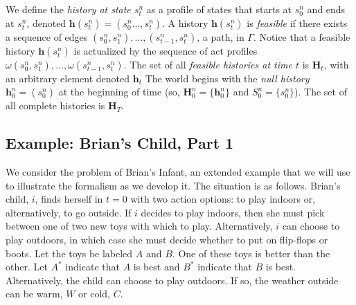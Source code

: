 \documentclass[
11pt,
titlepage,
reqno,
]{article}%
\theoremstyle{definition}
\begin{document}
We define the \textit{history at state $s^n_t$} as a profile of states that starts at $s^n_0$ and ends at $s^n_t$, denoted $\mathbf{h}(s^n_t)=(s^n_0\ldots,s^n_t)$.
A history $\mathbf{h}(s^n_t)$ is \textit{feasible} if there exists a sequence of edges $(s^n_0,s^n_1),\ldots,(s^n_{t-1},s^n_t)$, a path, in $\Gamma$.
Notice that a feasible history $\mathbf{h}(s^n_t)$ is actualized by the sequence of act profiles $\omega(s^n_0,s^n_1),\ldots,\omega(s^n_{t-1},s^n_t)$.
The set of all \textit{feasible histories at time $t$} is $\mathbf{H}_t$, with an arbitrary element  denoted $\mathbf{h}_t$
The world begins  with the \textit{null history} $\mathbf{h}^n_0=(s^n_0)$ at the beginning of time (so, $\mathbf{H}^n_0=\{\mathbf{h}^n_0\}$ and  $S^n_0=\{s^n_0\}$).   
The set of all complete histories is $\mathbf{H}_T$.

\subsection{Example: Brian's Child, Part 1}	
We consider the problem of Brian's Infant, an extended example that we will use  to illustrate the formalism as we develop it.
The situation is as follows.
Brian's child, $i$, finds herself in $t=0$ with two action options: to play indoors or, alternatively, to go outside. 
If $i$ decides to play indoors, then she must pick between one of two new toys with which to play.
Alternatively, $i$ can choose to play outdoors, in which case she must decide whether to put on flip-flops or boots.
Let the toys be labeled $A$ and $B$. 
One of these toys is better than the other. 
Let $A^\ast$ indicate that $A$ is best and $B^\ast$ indicate that $B$ is best. 
Alternatively, the child can choose to play outdoors.
If so,  the weather outside can be warm, $W$ or cold, $C$.
 
\end{document}
